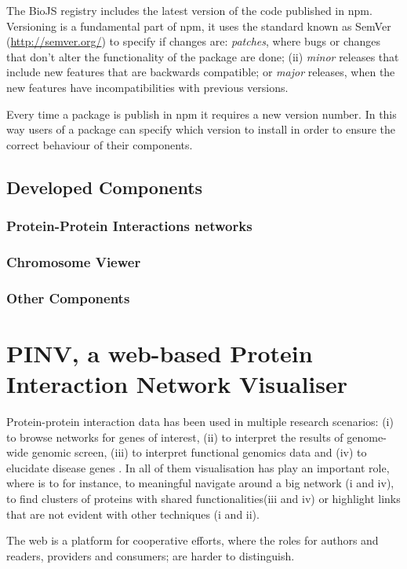 The BioJS registry includes the latest version of the code published in npm. Versioning is a fundamental part of npm, it uses the standard known as SemVer (\url{http://semver.org/}) to specify if changes are: \emph{patches}, where bugs or changes that don't alter the functionality of the package are done; (ii) \emph{minor} releases that include new features that are backwards compatible; or  \emph{major} releases, when the new features have incompatibilities with previous versions.

Every time a package is publish in npm it requires a new version number. In this way users of a package can specify which version to install in order to ensure the correct behaviour of their components.


\subsection{Developed Components} \label{subsec:biojs_components}
\subsubsection{Protein-Protein Interactions networks} \label{subsubsec:ppi_biojs}
\subsubsection{Chromosome Viewer}
\subsubsection{Other Components}

\section{PINV, a web-based Protein Interaction Network Visualiser }  \label{section:pinv}
Protein-protein interaction data has been used in multiple research scenarios: (i) to browse networks for genes of interest, (ii) to interpret the results of genome-wide genomic screen, (iii) to interpret functional genomics data and (iv) to elucidate disease genes \cite{FRA2013}. In all of them visualisation has play an important role, where is to for instance,  to meaningful navigate around a big network (i and iv), to find clusters of proteins with shared functionalities(iii and iv)  or highlight links that are not evident with other techniques (i and ii).

The web is a platform for cooperative efforts, where the roles for authors and readers, providers and consumers; are harder to distinguish.

